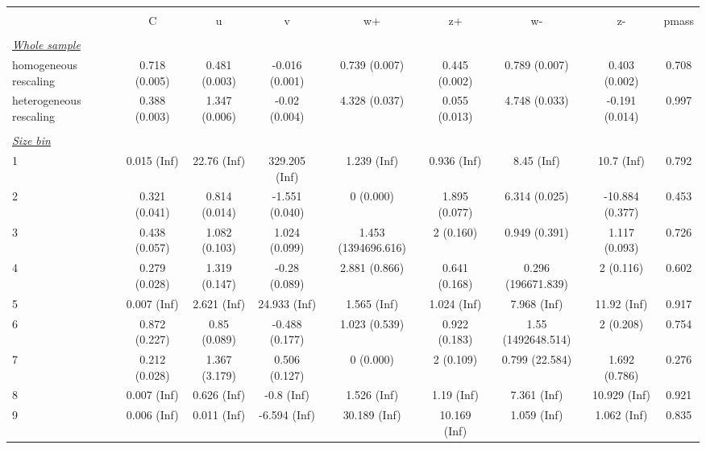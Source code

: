 
\begin{tabular}{@{\extracolsep{5pt}} l cccccccc} 
\\[-1.8ex]\hline 
\hline \\[-1.8ex] 
  & C & u & v & w+ & z+ & w- & z- & pmass \\ 
\hline \\[-1.8ex] 
\underline{{\it Whole sample}} &   &   &   &   &   &   &   &  \\ 
homogeneous rescaling & 0.718 (0.005) & 0.481 (0.003) & -0.016 (0.001) & 0.739 (0.007) & 0.445 (0.002) & 0.789 (0.007) & 0.403 (0.002) & 0.708 \\ 
heterogeneous rescaling & 0.388 (0.003) & 1.347 (0.006) & -0.02 (0.004) & 4.328 (0.037) & 0.055 (0.013) & 4.748 (0.033) & -0.191 (0.014) & 0.997 \\ 
 &   &   &   &   &   &   &   &  \\ 
\underline{{\it Size bin}} &   &   &   &   &   &   &   &  \\ 
1 & 0.015 (Inf) & 22.76 (Inf) & 329.205 (Inf) & 1.239 (Inf) & 0.936 (Inf) & 8.45 (Inf) & 10.7 (Inf) & 0.792 \\ 
2 & 0.321 (0.041) & 0.814 (0.014) & -1.551 (0.040) & 0 (0.000) & 1.895 (0.077) & 6.314 (0.025) & -10.884 (0.377) & 0.453 \\ 
3 & 0.438 (0.057) & 1.082 (0.103) & 1.024 (0.099) & 1.453 (1394696.616) & 2 (0.160) & 0.949 (0.391) & 1.117 (0.093) & 0.726 \\ 
4 & 0.279 (0.028) & 1.319 (0.147) & -0.28 (0.089) & 2.881 (0.866) & 0.641 (0.168) & 0.296 (196671.839) & 2 (0.116) & 0.602 \\ 
5 & 0.007 (Inf) & 2.621 (Inf) & 24.933 (Inf) & 1.565 (Inf) & 1.024 (Inf) & 7.968 (Inf) & 11.92 (Inf) & 0.917 \\ 
6 & 0.872 (0.227) & 0.85 (0.089) & -0.488 (0.177) & 1.023 (0.539) & 0.922 (0.183) & 1.55 (1492648.514) & 2 (0.208) & 0.754 \\ 
7 & 0.212 (0.028) & 1.367 (3.179) & 0.506 (0.127) & 0 (0.000) & 2 (0.109) & 0.799 (22.584) & 1.692 (0.786) & 0.276 \\ 
8 & 0.007 (Inf) & 0.626 (Inf) & -0.8 (Inf) & 1.526 (Inf) & 1.19 (Inf) & 7.361 (Inf) & 10.929 (Inf) & 0.921 \\ 
9 & 0.006 (Inf) & 0.011 (Inf) & -6.594 (Inf) & 30.189 (Inf) & 10.169 (Inf) & 1.059 (Inf) & 1.062 (Inf) & 0.835 \\ 

\end{tabular}

